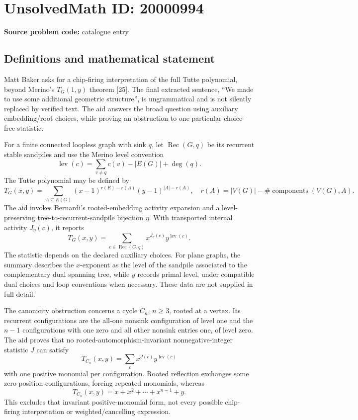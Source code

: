 \documentclass[11pt]{article}
\begin{document}
\section*{UnsolvedMath ID: 20000994}
\textbf{Source problem code:} catalogue entry
\subsection{Definitions and mathematical statement}
Matt Baker asks for a chip-firing interpretation of the full Tutte polynomial, beyond Merino's $T_G(1,y)$ theorem [25]. The final extracted sentence, ``We made to use some additional geometric structure'', is ungrammatical and is not silently replaced by verified text. The aid answers the broad question using auxiliary embedding/root choices, while proving an obstruction to one particular choice-free statistic.

For a finite connected loopless graph with sink $q$, let $\operatorname{Rec}(G,q)$ be its recurrent stable sandpiles and use the Merino level convention
\[
 \operatorname{lev}(c)=\sum_{v\neq q}c(v)-|E(G)|+\deg(q).
\]
The Tutte polynomial may be defined by
\[
 T_G(x,y)=\sum_{A\subseteq E(G)}(x-1)^{r(E)-r(A)}(y-1)^{|A|-r(A)},
 \quad r(A)=|V(G)|-\#\operatorname{components}(V(G),A).
\]
The aid invokes Bernardi's rooted-embedding activity expansion and a level-preserving tree-to-recurrent-sandpile bijection $\eta$. With transported internal activity $J_\eta(c)$, it reports
\[
 T_G(x,y)=\sum_{c\in\operatorname{Rec}(G,q)}x^{J_\eta(c)}y^{\operatorname{lev}(c)}.
\]
The statistic depends on the declared auxiliary choices. For plane graphs, the summary describes the $x$-exponent as the level of the sandpile associated to the complementary dual spanning tree, while $y$ records primal level, under compatible dual choices and loop conventions when necessary. These data are not supplied in full detail.

The canonicity obstruction concerns a cycle $C_n$, $n\geq3$, rooted at a vertex. Its recurrent configurations are the all-one nonsink configuration of level one and the $n-1$ configurations with one zero and all other nonsink entries one, of level zero. The aid proves that no rooted-automorphism-invariant nonnegative-integer statistic $J$ can satisfy
\[
 T_{C_n}(x,y)=\sum_c x^{J(c)}y^{\operatorname{lev}(c)}
\]
with one positive monomial per configuration. Rooted reflection exchanges some zero-position configurations, forcing repeated monomials, whereas
\[
 T_{C_n}(x,y)=x+x^2+\cdots+x^{n-1}+y.
\]
This excludes that invariant positive-monomial form, not every possible chip-firing interpretation or weighted/cancelling expression.
\end{document}
